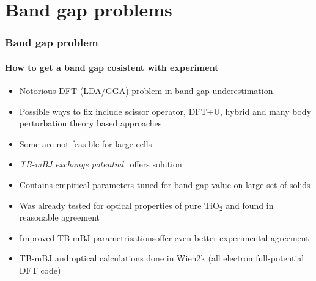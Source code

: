 \documentclass[noamsthm,8pt,t]{beamer}
\begin{document}
\section{Band gap problems}
\begin{frame}
   \frametitle{Band gap problem}
   \framesubtitle{How to get a band gap cosistent with experiment}

   \vspace{-0.3cm}
   \begin{itemize}
      \item Notorious DFT (LDA/GGA) problem in band gap underestimation.
      \item Possible ways to fix include scissor operator, DFT+U, hybrid and many body perturbation theory based approaches
      \item Some are not feasible for large cells
      \item<2-> \emph{TB-mBJ exchange potential}$^1$ offers solution
      \item<2-> Contains empirical parameters tuned for band gap value on large set of solids 
      \item<3-> Was already tested for optical properties of pure TiO$_2$ and found in reasonable agreement\footnotemark
      \item<3-> Improved TB-mBJ parametrisations\footnotemark offer even better experimental agreement
      \item<3-> TB-mBJ and optical calculations done in Wien2k (all electron full-potential DFT code)
   \end{itemize}

   
\end{frame}
\end{document}

